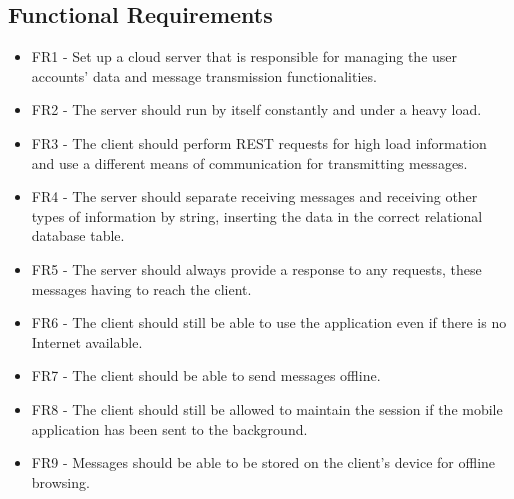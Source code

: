 \documentclass{article}
\begin{document}
\subsection{Functional Requirements}
\begin{itemize}
	\item FR1 - Set up a cloud server that is responsible for managing the user accounts' data and message transmission functionalities.
	\item FR2 - The server should run by itself constantly and under a heavy load.
	\item FR3 - The client should perform REST requests for high load information and use a different means of communication for transmitting messages.
	\item FR4 - The server should separate receiving messages and receiving other types of information by string, inserting the data in the correct relational database table.
	\item FR5 - The server should always provide a response to any requests, these messages having to reach the client.
	\item FR6 - The client should still be able to use the application even if there is no Internet available.
	\item FR7 - The client should be able to send messages offline.
	\item FR8 - The client should still be allowed to maintain the session if the mobile application has been sent to the background.
	\item FR9 - Messages should be able to be stored on the client's device for offline browsing.
	\end{itemize}
\end{document}
